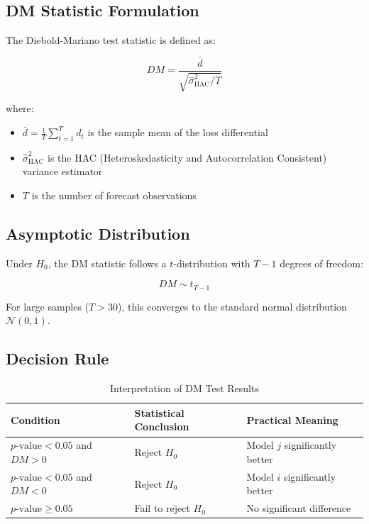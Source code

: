 \documentclass[11pt,a4paper]{article}
\begin{document}
\subsection{DM Statistic Formulation}

The Diebold-Mariano test statistic is defined as:

\begin{equation}
DM = \frac{\bar{d}}{\sqrt{\hat{\sigma}^2_{\text{HAC}} / T}}
\end{equation}

where:

\begin{itemize}
    \item $\bar{d} = \frac{1}{T} \sum_{t=1}^{T} d_t$ is the sample mean of the loss differential
    \item $\hat{\sigma}^2_{\text{HAC}}$ is the HAC (Heteroskedasticity and Autocorrelation Consistent) variance estimator
    \item $T$ is the number of forecast observations
\end{itemize}

\subsection{Asymptotic Distribution}

Under $H_0$, the DM statistic follows a $t$-distribution with $T-1$ degrees of freedom:

\begin{equation}
DM \sim t_{T-1}
\end{equation}

For large samples ($T > 30$), this converges to the standard normal distribution $\mathcal{N}(0, 1)$.

\subsection{Decision Rule}

\begin{table}[h]
\centering
\caption{Interpretation of DM Test Results}
\begin{tabular}{@{}lll@{}}
\toprule
\textbf{Condition} & \textbf{Statistical Conclusion} & \textbf{Practical Meaning} \\ \midrule
$p\text{-value} < 0.05$ and $DM > 0$ & Reject $H_0$ & Model $j$ significantly better \\
$p\text{-value} < 0.05$ and $DM < 0$ & Reject $H_0$ & Model $i$ significantly better \\
$p\text{-value} \geq 0.05$ & Fail to reject $H_0$ & No significant difference \\ \bottomrule
\end{tabular}
\end{table}
\end{document}

